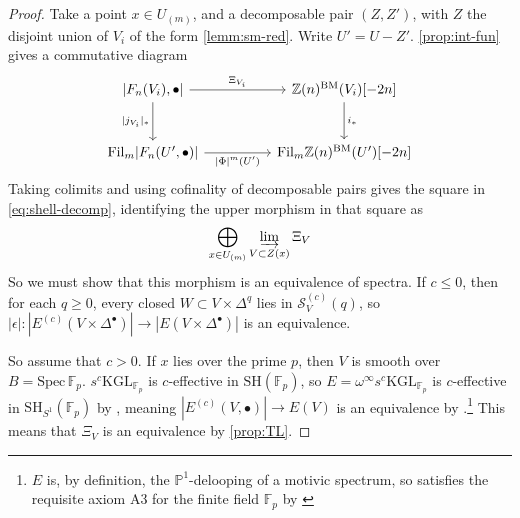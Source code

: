 \documentclass[11pt, twoside]{article}
\numberwithin{equation}{section}
\theoremstyle{definition}
\newcommand{\bb}[1]{\mathbb{#1}}
\newcommand{\colim}{\varinjlim}
\newcommand{\spec}{\mathrm{Spec} \,}
\newcommand{\fil}{\mathrm{Fil}}
\newcommand{\Kgl}{\mathrm{KGL}}
\newcommand{\sh}{\mathrm{SH}}
\newcommand{\bm}{\mathrm{BM}}
\begin{document}
\begin{proof}
Take a point \(x \in U_{(m)}\), and a decomposable pair \((Z, Z')\), with \(Z\) the disjoint union of \(V_i\) of the form \ref{lemm:sm-red}. Write \(U' = U - Z'\). \eqref{prop:int-fun} gives a commutative diagram 
\[\begin{tikzcd} [row sep = large, column sep = huge]
\lvert F_n(V_i), \bullet \rvert \ar[d, "\lvert j_{V_i} \rvert_*", swap] \ar[r, "\Xi_{V_i}"] & \bb{Z}(n)^\bm(V_i)\lbrack -2n \rbrack \ar[d, "i_*"]\\
\fil_m \lvert F_n(U', \bullet) \rvert \ar[r, "\lvert \Phi \rvert^m(U')", swap] & \fil_m \bb{Z}(n)^\bm(U') \lbrack - 2n \rbrack
\end{tikzcd}\]
Taking colimits and using cofinality of decomposable pairs gives the square in \ref{eq:shell-decomp}, identifying the upper morphism in that square as 
\[\bigoplus_{x \in U_{(m)}} \colim_{V \subset Z(x)} \Xi_V\]
So we must show that this morphism is an equivalence of spectra. If \(c \leq 0\), then for each \(q \geq 0\), every closed \(W \subset V \times \Delta^q\) lies in \(\mathcal{S}_V^{(c)}(q)\), so \(|\epsilon| \colon |E^{(c)}(V \times \Delta^\bullet)| \to |E( V \times \Delta^\bullet)|\) is an equivalence.

So assume that \(c > 0\). If \(x\) lies over the prime \(p\), then \(V\) is smooth over \(B = \spec \bb{F}_p\). \(s^c \Kgl_{\bb{F}_p}\) is \(c\)-effective in \(\sh(\bb{F}_p)\), so \(E = \omega^\infty s^c \Kgl_{\bb{F}_p}\) is \(c\)-effective in \(\sh_{S^1}(\bb{F}_p)\) by \cite[Theorem 9.0.3]{LevHC}, meaning \(|E^{(c)}(V, \bullet)| \to E(V)\) is an equivalence by \cite[Lemma 7.3.1]{LevHC}.\footnote{\(E\) is, by definition, the \(\bb{P}^1\)-delooping of a motivic spectrum, so satisfies the requisite axiom A3 for the finite field \(\bb{F}_p\) by \cite[Remark 2.1.1]{LevHC}} This means that \(\Xi_V\) is an equivalence by \ref{prop:TL}.


\end{proof}
\end{document}
